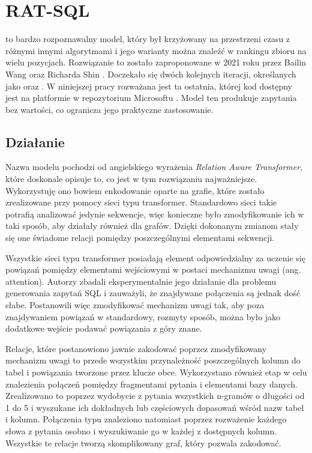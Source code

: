 \section{RAT-SQL}
 to bardzo rozpoznawalny model, który był krzyżowany na przestrzeni czasu z różnymi innymi algorytmami i jego warianty można znaleźć w rankingu zbioru  na wielu pozycjach. Rozwiązanie to zostało zaproponowane w 2021 roku przez Bailin Wang oraz Richarda Shin . Doczekało się dwóch kolejnych iteracji, określanych jako  oraz . W niniejszej pracy rozważana jest ta ostatnia, której kod dostępny jest na platformie  w repozytorium Microsoftu . Model ten produkuje zapytania bez wartości, co ogranicza jego praktyczne zastosowanie.

\subsection{Działanie}
Nazwa modelu  pochodzi od angielskiego wyrażenia \textit{Relation Aware Transformer}, które doskonale opisuje to, co jest w tym rozwiązaniu najważniejsze. Wykorzystuję ono bowiem enkodowanie oparte na grafie, które zostało zrealizowane przy pomocy sieci typu transformer. Standardowo sieci takie potrafią analizować jedynie sekwencje, więc konieczne było zmodyfikowanie ich w taki sposób, aby działały również dla grafów. Dzięki dokonanym zmianom stały się one świadome relacji pomiędzy poszczególnymi elementami sekwencji.

Wszystkie sieci typu transformer posiadają element odpowiedzialny za uczenie się powiązań pomiędzy elementami wejściowymi w postaci mechanizmu uwagi (ang. attention). Autorzy \mbox{} zbadali eksperymentalnie jego działanie dla problemu generowania zapytań SQL i zauważyli, że znajdywane połączenia są jednak dość słabe. Postanowili więc zmodyfikować mechanizm uwagi tak, aby poza znajdywaniem powiązań w standardowy, rozmyty sposób, można było jako dodatkowe wejście podawać powiązania z góry znane. 

Relacje, które postanowiono jawnie zakodować poprzez zmodyfikowany mechanizm uwagi to przede wszystkim przynależność poszczególnych kolumn do tabel i powiązania tworzone przez klucze obce. Wykorzystano również etap  w celu znalezienia połączeń pomiędzy fragmentami pytania i elementami bazy danych. Zrealizowano to poprzez wydobycie z pytania wszystkich n-gramów o długości od 1 do 5 i wyszukane ich dokładnych lub częściowych dopasowań wśród nazw tabel i kolumn. Połączenia typu  znaleziono natomiast poprzez rozważenie każdego słowa z pytania osobno i wyszukiwanie go w każdej z dostępnych kolumn. Wszystkie te relacje tworzą skomplikowany graf, który  pozwala zakodować.

